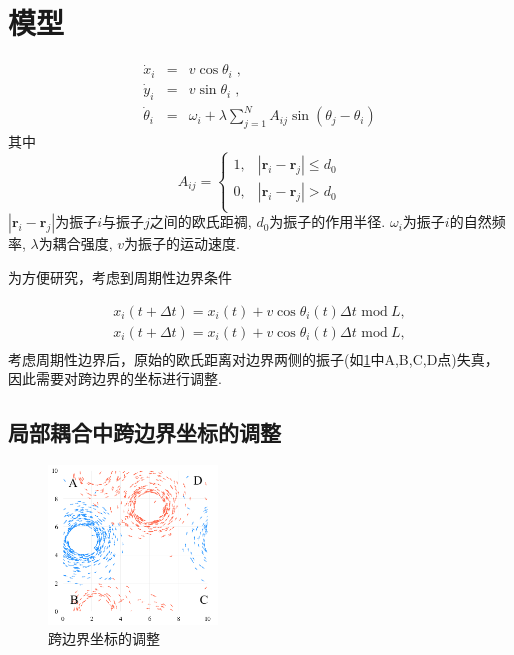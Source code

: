 \documentclass{article}
\begin{document}
\section{模型}

\begin{eqnarray}
    \dot{x}_i&=&v\cos \theta _i\;,\label{eq:dotxi}
  \\
    \dot{y}_i&=&v\sin \theta _i\;,\label{eq:dotyi}
  \\
    \dot{\theta}_i&=&\omega _i+\lambda \sum_{j=1}^N{A_{ij}\sin \left( \theta _j-\theta _i \right)}
    \label{eq:dotthetai}
\end{eqnarray}
其中
\begin{equation}
    A_{ij}=\begin{cases}
        1,&		\left| \mathbf{r}_i-\mathbf{r}_j \right|\le d_0\\
        0,&		\left| \mathbf{r}_i-\mathbf{r}_j \right|>d_0\\
    \end{cases}
\end{equation}
$\left| \mathbf{r}_i-\mathbf{r}_j \right|$为振子$i$与振子$j$之间的欧氏距禂, $d_0$为振子的作用半径. $\omega _i$为振子$i$的自然频率, $\lambda$为耦合强度, $v$为振子的运动速度.

为方便研究，考虑到周期性边界条件

\begin{equation}
    \begin{array}{c}
        x_i\left( t+\Delta t \right) =x_i\left( t \right) +v\cos \theta _i\left( t \right) \Delta t\,\,\mathrm{mod}\ L,\\
        x_i\left( t+\Delta t \right) =x_i\left( t \right) +v\cos \theta _i\left( t \right) \Delta t\,\,\mathrm{mod}\ L,\\
    \end{array}
\end{equation}
考虑周期性边界后，原始的欧氏距离对边界两侧的振子(如\ref{fig:fig1}中A,B,C,D点)失真，因此需要对跨边界的坐标进行调整. 

\subsection{局部耦合中跨边界坐标的调整}\label{positionAdj}

\begin{figure}[htbp]
    \centering
    \includegraphics[width=0.4\textwidth]{./figs/fig1.jpg}
    \caption{跨边界坐标的调整}
    \label{fig:fig1}
\end{figure}
\end{document}
